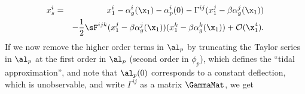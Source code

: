 \begin{eqnarray}
x^i_s &=& x^i_1 - \alpha^i_g(\x_1) - \alpha_p^i(0) - \Gamma^{ij} (x^j_1 - \beta \alpha^j_g(\x_1)) \nonumber \\
&&- \frac{1}{2} \sF^{ijk} (x^j_1 - \beta \alpha^j_g(\x_1)) (x^k_1 - \beta \alpha^k_g(\x_1)) + \mathcal{O}(\x_1^4) .
\end{eqnarray}
\normalsize
If we now remove the higher order terms in $\al_p$ by truncating the Taylor series in $\al_p$ at the first order in $\al_p$ (second order in $\phi_p$), which defines the ``tidal approximation'', and note that $\al_p(0)$ corresponds to a constant deflection, which is unobservable, and write $\Gamma^{ij}$ as a matrix $\GammaMat$, we get
  
  
  